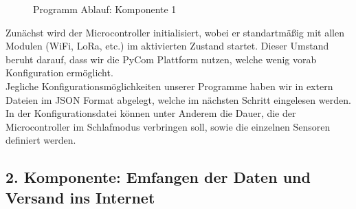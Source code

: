 \begin{center}
	\begin{figure}[h]
	 
	 \noindent{}
	 \caption[PAP komponente 1]{Programm Ablauf: Komponente 1}
	 \label{fig:lorasendsensorread}
	\end{figure}
\end{center}

Zunächst wird der Microcontroller initialisiert, wobei er standartmäßig mit allen Modulen (WiFi, LoRa, etc.) im aktivierten Zustand startet. Dieser Umstand beruht darauf, dass wir die PyCom Plattform nutzen, welche wenig vorab Konfiguration ermöglicht.\\
Jegliche Konfigurationsmöglichkeiten unserer Programme haben wir in extern Dateien im JSON Format abgelegt, welche im nächsten Schritt eingelesen werden. In der Konfigurationsdatei können unter Anderem die Dauer, die der Microcontroller im Schlafmodus verbringen soll, sowie die einzelnen Sensoren definiert werden.\\

\newpage

\subsection{2. Komponente: Emfangen der Daten und Versand ins Internet} \label{Empfänger}

